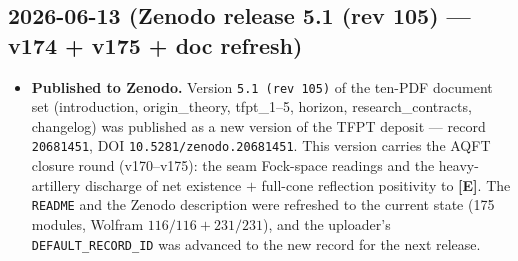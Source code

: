 \documentclass[11pt]{article}
\providecommand{\mE}{\textbf{[E]}}\providecommand{\mC}{\textbf{[C]}}
\begin{document}
\subsection*{2026-06-13 (Zenodo release 5.1 (rev 105) --- v174 + v175 + doc refresh)}
\begin{itemize}
\item \textbf{Published to Zenodo.} Version \texttt{5.1 (rev 105)} of the ten-PDF document set
  (introduction, origin\_theory, tfpt\_1--5, horizon, research\_contracts, changelog) was
  published as a new version of the TFPT deposit --- record \texttt{20681451},
  DOI \texttt{10.5281/zenodo.20681451}. This version carries the AQFT closure round (v170--v175):
  the seam Fock-space readings and the heavy-artillery discharge of net existence $+$ full-cone
  reflection positivity to \mE. The \texttt{README} and the Zenodo description were refreshed to the
  current state (175 modules, Wolfram $116/116 + 231/231$), and the uploader's
  \texttt{DEFAULT\_RECORD\_ID} was advanced to the new record for the next release.
\end{itemize}
\end{document}
